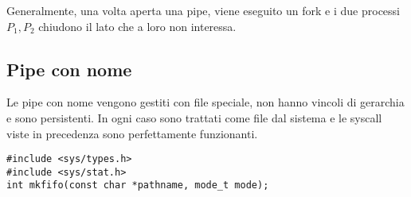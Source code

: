 \documentclass[11pt]{article}
\begin{document}
Generalmente, una volta aperta una pipe, viene eseguito un fork e i due processi $P_1, P_2$ chiudono il lato che a loro non interessa.

\subsection{Pipe con nome}

Le pipe con nome vengono gestiti con file speciale, non hanno vincoli di gerarchia e sono persistenti. In ogni caso sono trattati come file dal sistema e le syscall viste in precedenza sono perfettamente funzionanti.

\begin{verbatim}
#include <sys/types.h>
#include <sys/stat.h>
int mkfifo(const char *pathname, mode_t mode);
\end{verbatim}
\end{document}
